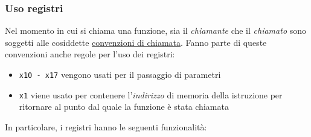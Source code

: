 \subsubsection*{Uso registri}
Nel momento in cui si chiama una funzione, sia il \textit{chiamante} che il \textit{chiamato} sono soggetti alle cosiddette \underline{convenzioni di chiamata}. Fanno parte di queste convenzioni anche regole per l'uso dei registri:
\begin{itemize}
	\item \verb|x10 - x17| vengono usati per il passaggio di parametri
	\item \verb|x1| viene usato per contenere l'\textit{indirizzo} di memoria della istruzione per ritornare al punto dal quale la funzione è stata chiamata
\end{itemize}
In particolare, i registri hanno le seguenti funzionalità:
\vskip3mm
